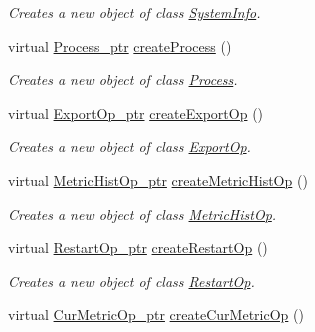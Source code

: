 \begin{DoxyCompactItemize}
\begin{DoxyCompactList}\small\item\em Creates a new object of class \hyperlink{classIMS__Data_1_1SystemInfo}{SystemInfo}. \item\end{DoxyCompactList}\item 
virtual \hyperlink{classIMS__Data_1_1Process}{Process\_\-ptr} \hyperlink{classIMS__Data_1_1IMS__DataFactory_a9b63fea9979796170c5f642e906d6e65}{createProcess} ()
\begin{DoxyCompactList}\small\item\em Creates a new object of class \hyperlink{classIMS__Data_1_1Process}{Process}. \item\end{DoxyCompactList}\item 
virtual \hyperlink{classIMS__Data_1_1ExportOp}{ExportOp\_\-ptr} \hyperlink{classIMS__Data_1_1IMS__DataFactory_ad5e1923ecfd30de85c072211bc1fa6b8}{createExportOp} ()
\begin{DoxyCompactList}\small\item\em Creates a new object of class \hyperlink{classIMS__Data_1_1ExportOp}{ExportOp}. \item\end{DoxyCompactList}\item 
virtual \hyperlink{classIMS__Data_1_1MetricHistOp}{MetricHistOp\_\-ptr} \hyperlink{classIMS__Data_1_1IMS__DataFactory_a0f489d9a775245d21a68e1033201ce36}{createMetricHistOp} ()
\begin{DoxyCompactList}\small\item\em Creates a new object of class \hyperlink{classIMS__Data_1_1MetricHistOp}{MetricHistOp}. \item\end{DoxyCompactList}\item 
virtual \hyperlink{classIMS__Data_1_1RestartOp}{RestartOp\_\-ptr} \hyperlink{classIMS__Data_1_1IMS__DataFactory_aaa2546af26b46197934eeac1a64029b9}{createRestartOp} ()
\begin{DoxyCompactList}\small\item\em Creates a new object of class \hyperlink{classIMS__Data_1_1RestartOp}{RestartOp}. \item\end{DoxyCompactList}\item 
virtual \hyperlink{classIMS__Data_1_1CurMetricOp}{CurMetricOp\_\-ptr} \hyperlink{classIMS__Data_1_1IMS__DataFactory_a51b794d06f8bc1260dbf00ef052bbb84}{createCurMetricOp} ()

\end{DoxyCompactItemize}

